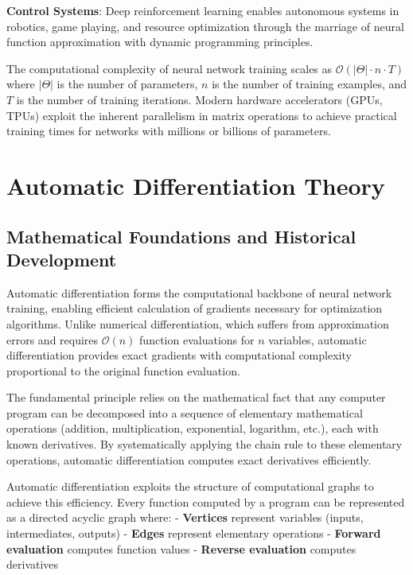 \documentclass[11pt,a4paper]{report}
\begin{document}
\textbf{Control Systems}: Deep reinforcement learning enables autonomous systems in robotics, game playing, and resource optimization through the marriage of neural function approximation with dynamic programming principles.

The computational complexity of neural network training scales as $\mathcal{O}(|\Theta| \cdot n \cdot T)$ where $|\Theta|$ is the number of parameters, $n$ is the number of training examples, and $T$ is the number of training iterations. Modern hardware accelerators (GPUs, TPUs) exploit the inherent parallelism in matrix operations to achieve practical training times for networks with millions or billions of parameters.

\section{Automatic Differentiation Theory}

\subsection{Mathematical Foundations and Historical Development}

Automatic differentiation forms the computational backbone of neural network training, enabling efficient calculation of gradients necessary for optimization algorithms. Unlike numerical differentiation, which suffers from approximation errors and requires $\mathcal{O}(n)$ function evaluations for $n$ variables, automatic differentiation provides exact gradients with computational complexity proportional to the original function evaluation.

The fundamental principle relies on the mathematical fact that any computer program can be decomposed into a sequence of elementary mathematical operations (addition, multiplication, exponential, logarithm, etc.), each with known derivatives. By systematically applying the chain rule to these elementary operations, automatic differentiation computes exact derivatives efficiently.

Automatic differentiation exploits the structure of computational graphs to achieve this efficiency. Every function computed by a program can be represented as a directed acyclic graph where:
- \textbf{Vertices} represent variables (inputs, intermediates, outputs)  
- \textbf{Edges} represent elementary operations
- \textbf{Forward evaluation} computes function values
- \textbf{Reverse evaluation} computes derivatives
\end{document}
